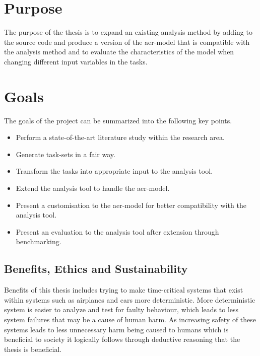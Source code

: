 \documentclass{kththesis}
\begin{document}


\section{Purpose}

The purpose of the thesis is to expand an existing analysis method by adding to the source code and
produce a version of the \acrshort{aer}-model that is compatible with the analysis method and to
evaluate the characteristics of the model when changing different input variables in the tasks.


\section{Goals}

The goals of the project can be summarized into the following key points.

\begin{itemize}
    \item Perform a state-of-the-art literature study within the research area.
    \item Generate task-sets in a fair way.
    \item Transform the tasks into appropriate input to the analysis tool.
    \item Extend the analysis tool to handle the \acrshort{aer}-model.
    \item Present a customisation to the \acrshort{aer}-model for better compatibility with the analysis tool.
    \item Present an evaluation to the analysis tool after extension through benchmarking.
\end{itemize}


\subsection{Benefits, Ethics and Sustainability}

Benefits of this thesis includes trying to make time-critical systems that exist within systems such
as airplanes and cars more deterministic. More deterministic system is easier to analyze and test
for faulty behaviour, which leads to less system failures that may be a cause of human harm. As
increasing safety of these systems leads to less unnecessary harm being caused to humans which is
beneficial to society it logically follows through deductive reasoning that the thesis is
beneficial.
\end{document}
